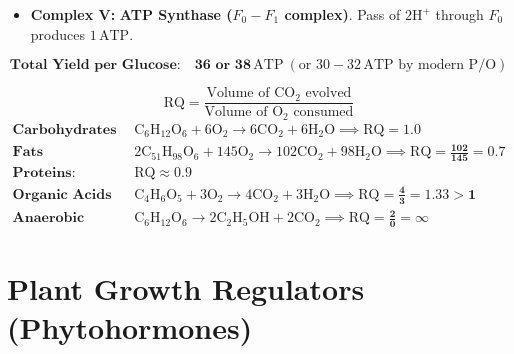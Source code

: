 \documentclass[10pt,a4paper]{article}
\begin{document}
\begin{formulabox}
\begin{itemize}
  \begin{equation}
    \frac{1}{2}\mathrm{O_2} + 2\mathrm{H}^+ + 2e^- \longrightarrow \mathrm{H_2O} \quad (\text{Metabolic water})
  \end{equation}
  \item \textbf{Complex V:} \textbf{ATP Synthase ($F_0-F_1$ complex)}. Pass of $2\mathrm{H}^+$ through $F_0$ produces $1\,\mathrm{ATP}$.
\end{itemize}
\begin{equation}
  \textbf{Total Yield per Glucose:} \quad \mathbf{36 \text{ or } 38\,\mathrm{ATP}} \ (\text{or } 30-32\,\mathrm{ATP} \text{ by modern P/O})
\end{equation}
\end{formulabox}

\begin{formulabox}
\begin{equation}
  \mathrm{RQ} = \frac{\text{Volume of } \mathrm{CO_2} \text{ evolved}}{\text{Volume of } \mathrm{O_2} \text{ consumed}}
\end{equation}
\begin{align*}
  \textbf{Carbohydrates (Glucose): } & \mathrm{C_6H_{12}O_6} + 6\mathrm{O_2} \to 6\mathrm{CO_2} + 6\mathrm{H_2O} \implies \mathbf{\mathrm{RQ} = 1.0}\\
  \textbf{Fats (Tripalmitin): } & 2\mathrm{C_{51}H_{98}O_6} + 145\mathrm{O_2} \to 102\mathrm{CO_2} + 98\mathrm{H_2O} \implies \mathbf{\mathrm{RQ} = \frac{102}{145} = 0.7}\\
  \textbf{Proteins: } & \mathbf{\mathrm{RQ} \approx 0.9}\\
  \textbf{Organic Acids (Malic Acid): } & \mathrm{C_4H_6O_5} + 3\mathrm{O_2} \to 4\mathrm{CO_2} + 3\mathrm{H_2O} \implies \mathbf{\mathrm{RQ} = \frac{4}{3} = 1.33 > 1}\\
  \textbf{Anaerobic Respiration: } & \mathrm{C_6H_{12}O_6} \to 2\mathrm{C_2H_5OH} + 2\mathrm{CO_2} \implies \mathbf{\mathrm{RQ} = \frac{2}{0} = \infty}
\end{align*}
\end{formulabox}

\section{Plant Growth Regulators (Phytohormones)}
\end{document}
